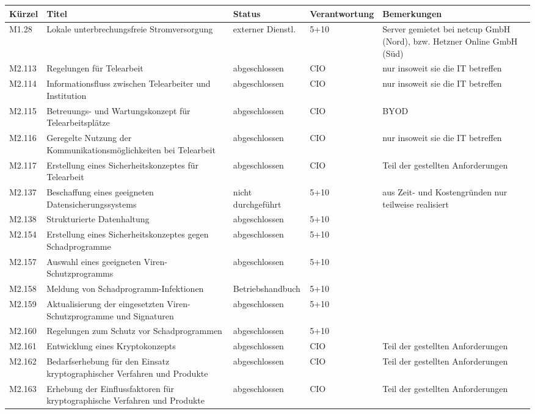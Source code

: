 \newpage
{}
\label{tab:massnahmen}
\begin{longtable}{lp{3.7cm}p{3cm}lp{3.8cm}}
\toprule
Kürzel & Titel & Status & Verantwortung & Bemerkungen \\
\midrule
M1.28 & Lokale unterbrechungsfreie Stromversorgung & externer Dienstl. & 5+10 & Server gemietet bei netcup GmbH (Nord), bzw. Hetzner Online GmbH (Süd) \\
M2.113 & Regelungen für Telearbeit & abgeschlossen & CIO & nur insoweit sie die IT betreffen \\
M2.114 & Informationsfluss zwischen Telearbeiter und Institution & abgeschlossen & CIO & nur insoweit sie die IT betreffen \\
M2.115 & Betreuungs- und Wartungskonzept für Telearbeitsplätze & abgeschlossen & CIO & BYOD \\
M2.116 & Geregelte Nutzung der Kommunikationsmöglichkeiten bei Telearbeit & abgeschlossen & CIO & nur insoweit sie die IT betreffen \\
M2.117 & Erstellung eines Sicherheitskonzeptes für Telearbeit & abgeschlossen & CIO & Teil der gestellten Anforderungen \\
M2.137 & Beschaffung eines geeigneten Datensicherungssystems & nicht durchgeführt & 5+10 & aus Zeit- und Kostengründen nur teilweise realisiert \\
M2.138 & Strukturierte Datenhaltung & abgeschlossen & 5+10 &  \\
M2.154 & Erstellung eines Sicherheitskonzeptes gegen Schadprogramme & abgeschlossen & 5+10 &  \\
M2.157 & Auswahl eines geeigneten Viren-Schutzprogramms & abgeschlossen & 5+10 &  \\
M2.158 & Meldung von Schadprogramm-Infektionen & Betriebshandbuch & 5+10 &  \\
M2.159 & Aktualisierung der eingesetzten Viren-Schutzprogramme und Signaturen & abgeschlossen & 5+10 &  \\
M2.160 & Regelungen zum Schutz vor Schadprogrammen & abgeschlossen & 5+10 &  \\
M2.161 & Entwicklung eines Kryptokonzepts & abgeschlossen & CIO & Teil der gestellten Anforderungen \\
M2.162 & Bedarfserhebung für den Einsatz kryptographischer Verfahren und Produkte & abgeschlossen & CIO & Teil der gestellten Anforderungen \\
M2.163 & Erhebung der Einflussfaktoren für kryptographische Verfahren und Produkte & abgeschlossen & CIO & Teil der gestellten Anforderungen \\

\end{longtable}
